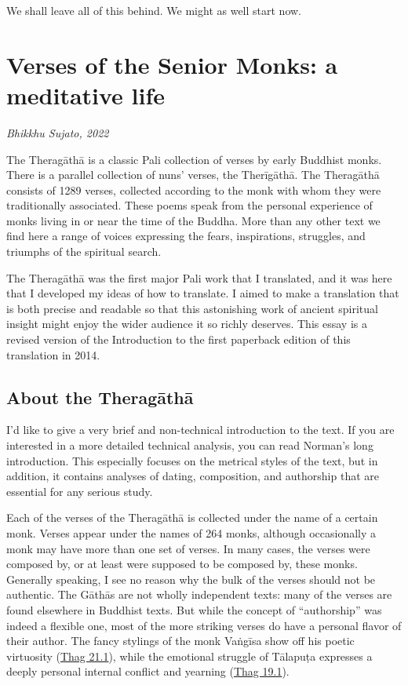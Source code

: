 \documentclass[12pt,openany]{book}%
\newcommand*{\scbyline}[1]{\begin{flushright}\textit{#1}\end{flushright}\bigskip}
\begin{document}
We shall leave all of this behind. We might as well start now.

%
\chapter*{Verses of the Senior Monks: a meditative life}

\scbyline{Bhikkhu Sujato, 2022}

The \textsanskrit{Theragāthā} is a classic Pali collection of verses by early Buddhist monks. There is a parallel collection of nuns’ verses, the \textsanskrit{Therīgāthā}. The \textsanskrit{Theragāthā} consists of 1289 verses, collected according to the monk with whom they were traditionally associated. These poems speak from the personal experience of monks living in or near the time of the Buddha. More than any other text we find here a range of voices expressing the fears, inspirations, struggles, and triumphs of the spiritual search.

The \textsanskrit{Theragāthā} was the first major Pali work that I translated, and it was here that I developed my ideas of how to translate. I aimed to make a translation that is both precise and readable so that this astonishing work of ancient spiritual insight might enjoy the wider audience it so richly deserves. This essay is a revised version of the Introduction to the first paperback edition of this translation in 2014.

\section*{About the \textsanskrit{Theragāthā}}

I’d like to give a very brief and non-technical introduction to the text. If you are interested in a more detailed technical analysis, you can read Norman’s long introduction. This especially focuses on the metrical styles of the text, but in addition, it contains analyses of dating, composition, and authorship that are essential for any serious study.

Each of the verses of the \textsanskrit{Theragāthā} is collected under the name of a certain monk. Verses appear under the names of 264 monks, although occasionally a monk may have more than one set of verses. In many cases, the verses were composed by, or at least were supposed to be composed by, these monks. Generally speaking, I see no reason why the bulk of the verses should not be authentic. The \textsanskrit{Gāthās} are not wholly independent texts: many of the verses are found elsewhere in Buddhist texts. But while the concept of “authorship” was indeed a flexible one, most of the more striking verses do have a personal flavor of their author. The fancy stylings of the monk \textsanskrit{Vaṅgīsa} show off his poetic virtuosity (\href{https://suttacentral.net/thag21.1}{Thag 21.1}), while the emotional struggle of \textsanskrit{Tālapuṭa} expresses a deeply personal internal conflict and yearning (\href{https://suttacentral.net/thag19.1}{Thag 19.1}).
\end{document}
